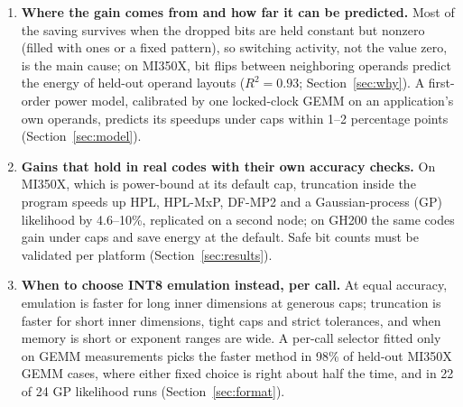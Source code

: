 \documentclass[conference]{IEEEtran}
\newcommand{\pct}{\%}
\begin{document}
\begin{enumerate}
\item \textbf{Where the gain comes from and how far it can be predicted.} Most of the saving survives when the dropped
bits are held constant but nonzero (filled with ones or a fixed pattern), so switching activity, not the value zero, is
the main cause; on MI350X, bit flips between neighboring operands predict the energy of held-out operand layouts
($R^2=0.93$; Section~\ref{sec:why}). A first-order power model, calibrated by one locked-clock GEMM on an application's
own operands, predicts its speedups under caps within 1--2 percentage points (Section~\ref{sec:model}).
\item \textbf{Gains that hold in real codes with their own accuracy checks.} On MI350X, which is power-bound at its
default cap, truncation inside the program speeds up HPL, HPL-MxP, DF-MP2 and a Gaussian-process (GP) likelihood by
4.6--10\pct, replicated on a second node; on GH200 the same codes gain under caps and save energy at the default.
Safe bit counts must be validated per platform (Section~\ref{sec:results}).
\item \textbf{When to choose INT8 emulation instead, per call.} At equal accuracy, emulation is faster for long inner
dimensions at generous caps; truncation is faster for short inner dimensions, tight caps and strict tolerances, and when
memory is short or exponent ranges are wide. A per-call selector fitted only on GEMM measurements picks the faster method
in 98\pct{} of held-out MI350X GEMM cases, where either fixed choice is right about half the time, and in 22 of 24 GP
likelihood runs (Section~\ref{sec:format}).
\end{enumerate}
\end{document}
